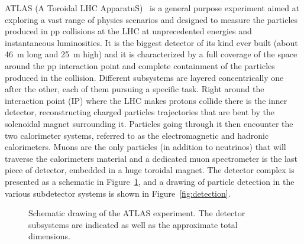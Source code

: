 ATLAS (A Toroidal LHC ApparatuS)~\cite{Aad:2008zzm} is a general purpose experiment
aimed at exploring a vast range of physics scenarios and designed to measure the particles
produced in pp collisions at the LHC at unprecedented energies and instantaneous luminosities. 
It is the biggest detector of its kind ever built (about 46~m long and 25~m high)
and it is characterized by
a full coverage of the space around the pp interaction point and complete
containment of the particles produced in the collision. Different subsystems are
layered concentrically one after the other, each of them pursuing a specific task. 
Right around the interaction point
(IP) where the LHC makes protons collide there is the inner detector, reconstructing
charged particles trajectories that are bent by the solenoidal magnet surrounding
it. Particles going through it then encounter the two calorimeter systems, referred to as
the electromagnetic and hadronic calorimeters. Muons are the only particles 
(in addition to neutrinos) that will traverse
the calorimeters material and a dedicated muon spectrometer is the last
piece of detector, embedded in a huge toroidal magnet. The detector complex is presented
as a schematic in Figure~\ref{fig:atlas}, and a drawing of particle detection in the various
subdetector systems is shown in Figure~\ref{fig:detection}. 

\begin{figure}[htb]\begin{center}
	\caption{Schematic drawing of the ATLAS experiment. The detector 
subsystems are indicated as well as the approximate total dimensions.\label{fig:atlas}}
\end{center}\end{figure}

